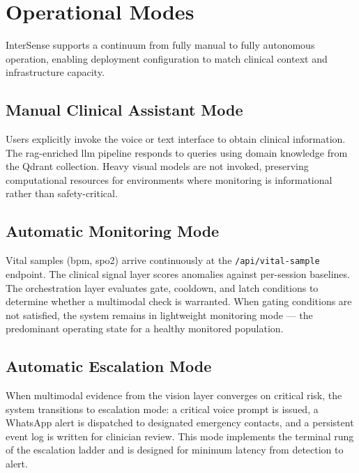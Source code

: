 \documentclass[10pt,twocolumn,a4paper]{article}
\begin{document}
\section{Operational Modes}

InterSense supports a continuum from fully manual to fully autonomous
operation, enabling deployment configuration to match clinical context
and infrastructure capacity.

\subsection{Manual Clinical Assistant Mode}

Users explicitly invoke the voice or text interface to obtain clinical
information.  The \gls{rag}-enriched \gls{llm} pipeline responds to
queries using domain knowledge from the Qdrant collection.  Heavy
visual models are not invoked, preserving computational resources for
environments where monitoring is informational rather than
safety-critical.

\subsection{Automatic Monitoring Mode}

Vital samples (\gls{bpm}, \gls{spo2}) arrive continuously at the
\texttt{/api/vital-sample} endpoint.  The clinical signal layer scores
anomalies against per-session baselines.  The orchestration layer
evaluates gate, cooldown, and latch conditions to determine whether a
multimodal check is warranted.  When gating conditions are not
satisfied, the system remains in lightweight monitoring mode — the
predominant operating state for a healthy monitored population.

\subsection{Automatic Escalation Mode}

When multimodal evidence from the vision layer converges on critical
risk, the system transitions to escalation mode: a critical voice
prompt is issued, a WhatsApp alert is dispatched to designated
emergency contacts, and a persistent event log is written for
clinician review.  This mode implements the terminal rung of the
escalation ladder and is designed for minimum latency from detection to
alert.
\end{document}
